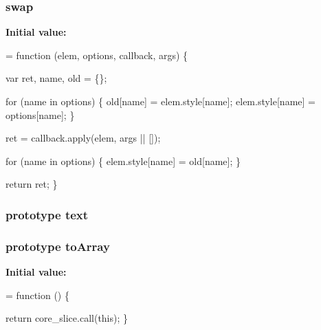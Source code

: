\subsubsection[{\texorpdfstring{swap}{swap}}]{ swap}\hypertarget{jquery-2_82_81-vsdoc_8js_a5e5b5f48f4ead1c526f9a8aede2780ef}{}\label{jquery-2_82_81-vsdoc_8js_a5e5b5f48f4ead1c526f9a8aede2780ef}
{\bfseries Initial value\+:}
\begin{DoxyCode}
= \textcolor{keyword}{function} (elem, options, callback, args) \{

        var ret, name,
            old = \{\};

        
        \textcolor{keywordflow}{for} (name in options) \{
            old[name] = elem.style[name];
            elem.style[name] = options[name];
        \}

        ret = callback.apply(elem, args || []);

        
        \textcolor{keywordflow}{for} (name in options) \{
            elem.style[name] = old[name];
        \}

        \textcolor{keywordflow}{return} ret;
    \}
\end{DoxyCode}
\subsubsection[{\texorpdfstring{text}{text}}]{ {\bf prototype} text}\hypertarget{jquery-2_82_81-vsdoc_8js_aa5b77da29631a344064bb3d20c8702de}{}\label{jquery-2_82_81-vsdoc_8js_aa5b77da29631a344064bb3d20c8702de}
\subsubsection[{\texorpdfstring{to\+Array}{toArray}}]{ {\bf prototype} to\+Array}\hypertarget{jquery-2_82_81-vsdoc_8js_a6a1f7257e5962f80de1ab2941bc232c4}{}\label{jquery-2_82_81-vsdoc_8js_a6a1f7257e5962f80de1ab2941bc232c4}
{\bfseries Initial value\+:}
\begin{DoxyCode}
= \textcolor{keyword}{function} () \{
        

        \textcolor{keywordflow}{return} core\_slice.call(\textcolor{keyword}{this});
    \}
\end{DoxyCode}
